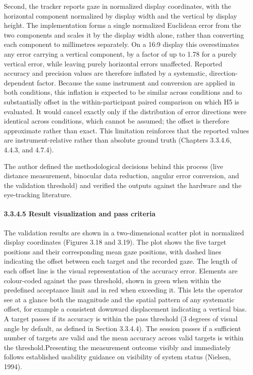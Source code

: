 \documentclass[
]{article}
\begin{document}
Second, the tracker reports gaze in normalized display coordinates, with the horizontal component normalized by display width and the vertical by display height. The implementation forms a single normalized Euclidean error from the two components and scales it by the display width alone, rather than converting each component to millimetres separately. On a 16:9 display this overestimates any error carrying a vertical component, by a factor of up to 1.78 for a purely vertical error, while leaving purely horizontal errors unaffected. Reported accuracy and precision values are therefore inflated by a systematic, direction-dependent factor. Because the same instrument and conversion are applied in both conditions, this inflation is expected to be similar across conditions and to substantially offset in the within-participant paired comparison on which H5 is evaluated. It would cancel exactly only if the distribution of error directions were identical across conditions, which cannot be assumed; the offset is therefore approximate rather than exact. This limitation reinforces that the reported values are instrument-relative rather than absolute ground truth (Chapters 3.3.4.6, 4.4.3, and 4.7.4).

The author defined the methodological decisions behind this process (live distance measurement, binocular data reduction, angular error conversion, and the validation threshold) and verified the outputs against the hardware and the eye-tracking literature.

\hypertarget{result-visualisation-and-pass-criteria}{%
\paragraph{3.3.4.5 Result visualization and pass criteria}\label{result-visualisation-and-pass-criteria}}

The validation results are shown in a two-dimensional scatter plot in normalized display coordinates (Figures 3.18 and 3.19). The plot shows the five target positions and their corresponding mean gaze positions, with dashed lines indicating the offset between each target and the recorded gaze. The length of each offset line is the visual representation of the accuracy error. Elements are colour-coded against the pass threshold, shown in green when within the predefined acceptance limit and in red when exceeding it. This lets the operator see at a glance both the magnitude and the spatial pattern of any systematic offset, for example a consistent downward displacement indicating a vertical bias. A target passes if its accuracy is within the pass threshold (3 degrees of visual angle by default, as defined in Section 3.3.4.4). The session passes if a sufficient number of targets are valid and the mean accuracy across valid targets is within the threshold.Presenting the measurement outcome visibly and immediately follows established usability guidance on visibility of system status (Nielsen, 1994).
\end{document}
